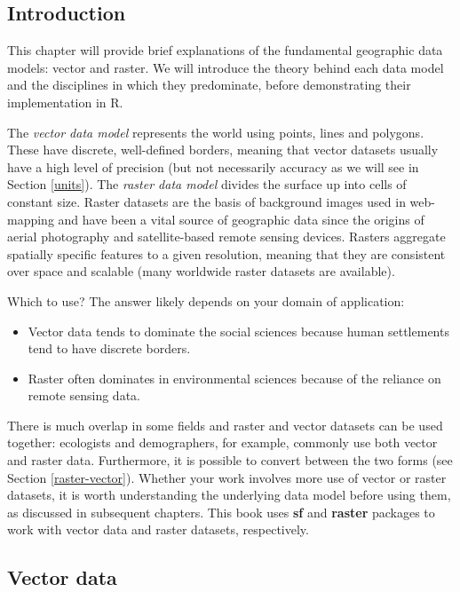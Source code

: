 \documentclass[]{krantz}
\providecommand{\tightlist}{%
  \setlength{\itemsep}{0pt}\setlength{\parskip}{0pt}}
\begin{document}
\hypertarget{intro-spatial-class}{%
\subsection{Introduction}\label{intro-spatial-class}}

This chapter will provide brief explanations of the fundamental geographic data models: vector and raster.
We will introduce the theory behind each data model and the disciplines in which they predominate, before demonstrating their implementation in R.

The \emph{vector data model} represents the world using points, lines and polygons.
These have discrete, well-defined borders, meaning that vector datasets usually have a high level of precision (but not necessarily accuracy as we will see in Section \ref{units}).
The \emph{raster data model} divides the surface up into cells of constant size.
Raster datasets are the basis of background images used in web-mapping and have been a vital source of geographic data since the origins of aerial photography and satellite-based remote sensing devices.
Rasters aggregate spatially specific features to a given resolution, meaning that they are consistent over space and scalable (many worldwide raster datasets are available).

Which to use?
The answer likely depends on your domain of application:

\begin{itemize}
\tightlist
\item
  Vector data tends to dominate the social sciences because human settlements tend to have discrete borders.
\item
  Raster often dominates in environmental sciences because of the reliance on remote sensing data.
\end{itemize}

There is much overlap in some fields and raster and vector datasets can be used together:
ecologists and demographers, for example, commonly use both vector and raster data.
Furthermore, it is possible to convert between the two forms (see Section \ref{raster-vector}).
Whether your work involves more use of vector or raster datasets, it is worth understanding the underlying data model before using them, as discussed in subsequent chapters.
This book uses \textbf{sf} and \textbf{raster} packages to work with vector data and raster datasets, respectively.

\hypertarget{vector-data}{%
\subsection{Vector data}\label{vector-data}}
\end{document}
